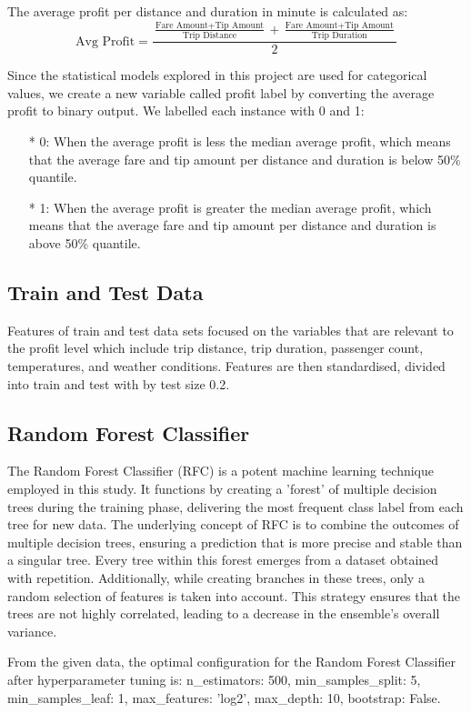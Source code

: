\documentclass[11pt]{article}
\begin{document}
The average profit per distance and duration in minute is calculated as:
  \[
    \text{Avg Profit} = \frac{\frac{\text{Fare Amount} + \text{Tip Amount}}{\text{Trip Distance}} + \frac{\text{Fare Amount} + \text{Tip Amount}}{\text{Trip Duration}}} {2}
  \]

Since the statistical models explored in this project are used for categorical values, we create a new variable called profit label by converting the average profit to binary output. We labelled each instance with 0 and 1:
\begin{itemize}
        \item[*] 0: When the average profit is less the median average profit, which means that the average fare and tip amount per distance and duration is below 50\% quantile.
        \item[*] 1: When the average profit is greater the median average profit, which means that the average fare and tip amount per distance and duration is above 50\% quantile.
\end{itemize}

\subsection{Train and Test Data}
Features of train and test data sets focused on the variables that are relevant to the profit level which include trip distance, trip duration, passenger count, temperatures, and weather conditions. Features are then standardised, divided into train and test with by test size 0.2.

\subsection{Random Forest Classifier}
The Random Forest Classifier (RFC) is a potent machine learning technique employed in this study. It functions by creating a 'forest' of multiple decision trees during the training phase, delivering the most frequent class label from each tree for new data. The underlying concept of RFC is to combine the outcomes of multiple decision trees, ensuring a prediction that is more precise and stable than a singular tree. Every tree within this forest emerges from a dataset obtained with repetition. Additionally, while creating branches in these trees, only a random selection of features is taken into account. This strategy ensures that the trees are not highly correlated, leading to a decrease in the ensemble's overall variance.

From the given data, the optimal configuration for the Random Forest Classifier after hyperparameter tuning is: n\_estimators: 500, min\_samples\_split: 5,
min\_samples\_leaf: 1, max\_features: 'log2', max\_depth: 10, bootstrap: False. 
\end{document}
